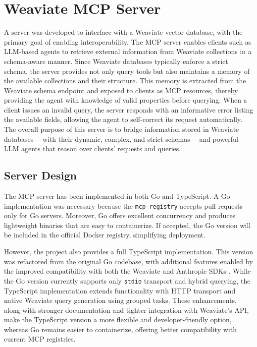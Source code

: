 \section{Weaviate MCP Server}\label{sec:weaviate-mcp-server}
A  server was developed to interface with a Weaviate vector database, with the primary goal of enabling interoperability. The MCP server enables clients such as \gls{LLM}-based agents to retrieve external information from Weaviate collections in a schema-aware manner. Since Weaviate databases typically enforce a strict schema, the server provides not only query tools but also maintains a memory of the available collections and their structure. This memory is extracted from the Weaviate schema endpoint and exposed to clients as MCP resources, thereby providing the agent with knowledge of valid properties before querying. When a client issues an invalid query, the server responds with an informative error listing the available fields, allowing the agent to self-correct its request automatically. The overall purpose of this server is to bridge information stored in Weaviate databases— with their dynamic, complex, and strict schemas— and powerful \gls{LLM} agents that reason over clients' requests and queries.

\subsection{Server Design}

The MCP server has been implemented in both Go and TypeScript. A Go implementation was necessary because the \texttt{mcp-registry} accepts pull requests only for Go servers. Moreover, Go offers excellent concurrency and produces lightweight binaries that are easy to containerize. If accepted, the Go version will be included in the official Docker registry, simplifying deployment.

However, the project also provides a full TypeScript implementation. This version was refactored from the original Go codebase, with additional features enabled by the improved compatibility with both the Weaviate and Anthropic SDKs \cite{stainless_mcp_comparison}. While the Go version currently supports only \texttt{stdio} transport and hybrid querying, the TypeScript implementation extends functionality with HTTP transport and native Weaviate query generation using grouped tasks. These enhancements, along with stronger documentation and tighter integration with Weaviate's API, make the TypeScript version a more flexible and developer-friendly option, whereas Go remains easier to containerize, offering better compatibility with current \gls{MCP} registries.
